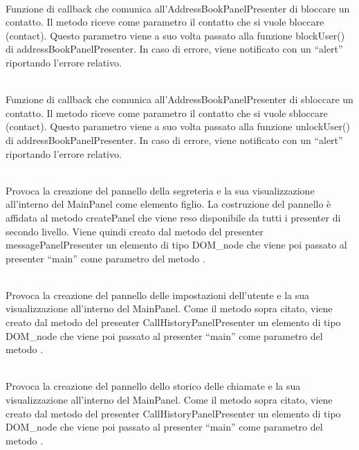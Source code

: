 \begin{description}
\item{}\\
Funzione di callback che comunica all'AddressBookPanelPresenter di bloccare un contatto. Il metodo riceve come parametro il contatto che si vuole bloccare (contact). Questo parametro viene a suo volta passato alla funzione blockUser() di addressBookPanelPresenter. In caso di errore, viene notificato con un ``alert'' riportando l'errore relativo.


\item{}\\
Funzione di callback che comunica all'AddressBookPanelPresenter di sbloccare un contatto. Il metodo riceve come parametro il contatto che si vuole sbloccare (contact). Questo parametro viene a suo volta passato alla funzione unlockUser() di addressBookPanelPresenter. In caso di errore, viene notificato con un ``alert'' riportando l'errore relativo.


\item{}\\
Provoca la creazione del pannello della segreteria e la sua visualizzazione all'interno del MainPanel come elemento figlio. La costruzione del pannello è affidata al metodo createPanel che viene reso disponibile da tutti i presenter di secondo livello. Viene quindi creato dal metodo  del presenter messagePanelPresenter un elemento di tipo DOM\_node che viene poi passato al presenter ``main'' come parametro del metodo .


\item{}\\
Provoca la creazione del pannello delle impostazioni dell'utente e la sua visualizzazione all'interno del MainPanel. Come il metodo sopra citato, viene creato dal metodo  del presenter CallHistoryPanelPresenter un elemento di tipo DOM\_node che viene poi passato al presenter ``main'' come parametro del metodo .


\item{}\\
Provoca la creazione del pannello dello storico delle chiamate e la sua visualizzazione all'interno del MainPanel. Come il metodo sopra citato, viene creato dal metodo  del presenter CallHistoryPanelPresenter un elemento di tipo DOM\_node che viene poi passato al presenter ``main'' come parametro del metodo .



\end{description}
